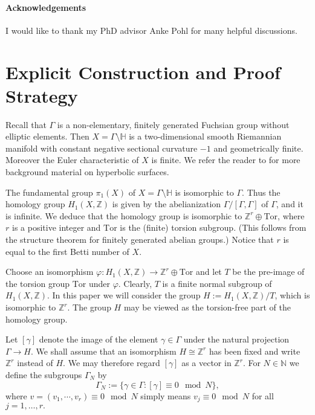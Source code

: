 \documentclass[12pt]{article}
\newcommand{\ZZ}{\mathbb{Z}}
\newcommand{\HH}{\mathbb{H}}
\begin{document}
\paragraph{Acknowledgements} I would like to thank my PhD advisor Anke Pohl for many helpful discussions.


\section{Explicit Construction and Proof Strategy}\label{construction}


Recall that $ \Gamma $ is a non-elementary, finitely generated Fuchsian group without elliptic elements. Then $ X = \Gamma\setminus \HH $ is a two-dimensional smooth Riemannian manifold with constant negative sectional curvature $ -1 $ and geometrically finite. Moreover the Euler characteristic of $ X $ is finite. We refer the reader to \cite[Chapter~2]{Borthwick} for more background material on hyperbolic surfaces.

The fundamental group $ \pi_{1}(X) $ of $ X= \Gamma\setminus \HH $ is isomorphic to $ \Gamma $. Thus the homology group $ H_{1}(X, \ZZ)$ is given by the abelianization $\Gamma/[\Gamma, \Gamma] $ of $ \Gamma $, and it is infinite. We deduce that the homology group is isomorphic to $ \ZZ^{r}\oplus \mathrm{Tor} $, where $ r $ is a positive integer and $ \mathrm{Tor} $ is the (finite) torsion subgroup. (This follows from the structure theorem for finitely generated abelian groups.) Notice that $ r $ is equal to the first Betti number of $ X $.

Choose an isomorphism $ \varphi : H_{1}(X, \ZZ)\to \ZZ^{r}\oplus \mathrm{Tor} $ and let $ T $ be the pre-image of the torsion group $ \mathrm{Tor} $ under $ \varphi $. Clearly, $ T $ is a finite normal subgroup of $ H_{1}(X, \ZZ). $ In this paper we will consider the group $ H:= H_{1}(X, \ZZ)/T $, which is isomorphic to $ \ZZ^{r} $. The group $ H $ may be viewed as the torsion-free part of the homology group.

Let $ [\gamma] $ denote the image of the element $ \gamma\in \Gamma $ under the natural projection $ \Gamma\to H $. We shall assume that an isomorphism $ H\cong \ZZ^{r} $ has been fixed and write $ \ZZ^{r} $ instead of $ H $. We may therefore regard $ [\gamma] $ as a vector in $ \ZZ^{r} $. For $ N\in \mathbb{N} $ we define the subgroups $ \Gamma_{N} $ by 
\begin{equation}\label{Arbi}
\Gamma_{N} := \{ \gamma\in \Gamma : [\gamma] \equiv 0 \mod N \},
\end{equation}
where $ v=(v_{1}, \cdots, v_{r}) \equiv 0 \mod N $ simply means $ v_{j}\equiv 0\mod N $ for all $ j=1,\dots, r. $
\end{document}
